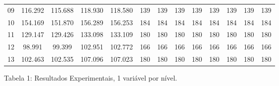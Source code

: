 \documentclass[12pt,a4paper]{article}
\begin{document}
\begin{adjustbox}{width={\textwidth}, totalheight={\textheight}, keepaspectratio}
\begin{tabular}{l cccc cccc cccc}
            09    & 116.292                                    & 115.688                         & 118.930                            & 118.580    & 139 & 139 & 139 & 139        & 139 & 139 & 139 & 139        \\
            10    & 154.169                                    & 151.870                         & 156.289                            & 156.253    & 184 & 184 & 184 & 184        & 184 & 184 & 184 & 184        \\
            11    & 129.147                                    & 129.426                         & 133.098                            & 133.109    & 180 & 180 & 180 & 180        & 180 & 180 & 180 & 180        \\
            12    & 98.991                                     & 99.399                          & 102.951                            & 102.772    & 166 & 166 & 166 & 166        & 166 & 166 & 166 & 166        \\
            13    & 102.463                                    & 102.535                         & 107.096                            & 107.023    & 180 & 180 & 180 & 180        & 180 & 180 & 180 & 180        \\
            \bottomrule
      \end{tabular}
\end{adjustbox}

\vspace*{0.5cm}

\begin{center}
      Tabela 1: Resultados Experimentais, 1 variável por nível.
\end{center}

\vspace*{1cm}
\end{document}
